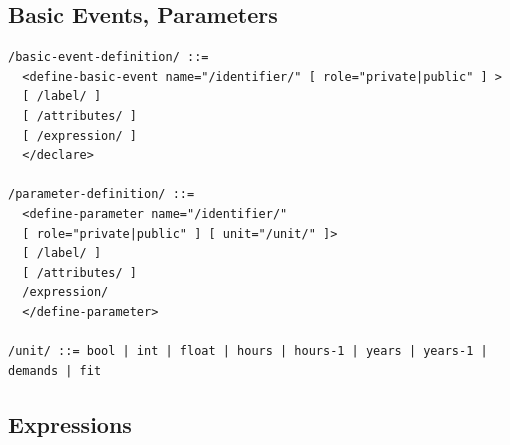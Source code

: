 \documentclass[11pt]{article}
\begin{document}
\subsection{Basic Events, Parameters}
\label{sec:org795fe47}

\lstset{language=[LaTeX]TeX,label= ,caption= ,captionpos=b,numbers=none}
\begin{lstlisting}
/basic-event-definition/ ::=
  <define-basic-event name="/identifier/" [ role="private|public" ] >
  [ /label/ ]
  [ /attributes/ ]
  [ /expression/ ]
  </declare>

/parameter-definition/ ::=
  <define-parameter name="/identifier/"
  [ role="private|public" ] [ unit="/unit/" ]>
  [ /label/ ]
  [ /attributes/ ]
  /expression/
  </define-parameter>

/unit/ ::= bool | int | float | hours | hours-1 | years | years-1 | demands | fit
\end{lstlisting}

\subsection{Expressions}
\label{sec:orga72b1df}
\end{document}
